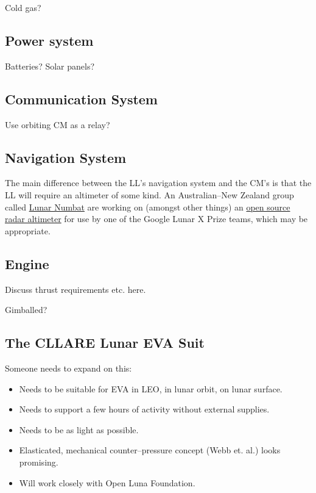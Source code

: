 \documentclass{report}
\begin{document}
Cold gas?

\subsection{Power system}

Batteries?  Solar panels?

\subsection{Communication System}

Use orbiting CM as a relay?

\subsection{Navigation System}

The main difference between the LL's navigation system and the CM's is that the LL will require an altimeter of some kind.  An Australian--New Zealand group called \href{http://www.lunarnumbat.org}{Lunar Numbat} are working on (amongst other things) an \href{http://www.lunarnumbat.org/cgi-bin/twiki/view/LunarNumbat/LNTaskRadarAltimeter}{open source radar altimeter} for use by one of the Google Lunar X Prize teams, which may be appropriate.

\subsection{Engine}

Discuss thrust requirements etc. here.

Gimballed?

\subsection{The CLLARE Lunar EVA Suit}

Someone needs to expand on this:
\begin{itemize}
\item Needs to be suitable for EVA in LEO, in lunar orbit, on lunar surface.
\item Needs to support a few hours of activity without external supplies.
\item Needs to be as light as possible.
\item Elasticated, mechanical counter--pressure concept (Webb et. al.) looks promising.
\item Will work closely with Open Luna Foundation.
\end{itemize}
\end{document}
